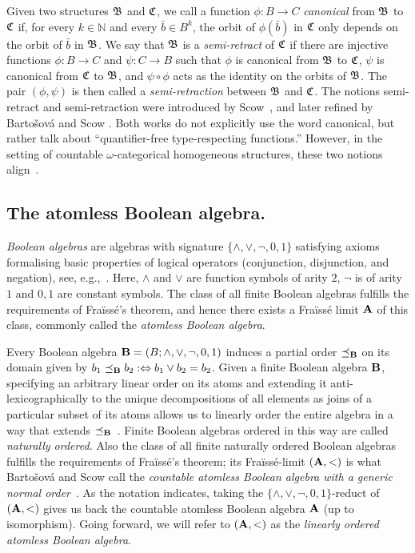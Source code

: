 Given two structures $\mathfrak{B}$ and $\mathfrak{C}$, we call a function $\phi\colon B\rightarrow C$ \emph{canonical} from $\mathfrak{B}$ to $\mathfrak{C}$ if, for every $k\in \mathbb{N}$ and every $\bar{b}\in B^k$, the orbit of $\phi(\bar{b})$ in $\mathfrak{C}$ only depends on the orbit of $\bar{b}$ in $\mathfrak{B}$.
%
We say that $\mathfrak{B}$ is a \emph{semi-retract} of $\mathfrak{C}$ if there are injective functions $\phi\colon B\rightarrow C$ and $\psi\colon C\rightarrow B$ such that $\phi$ is canonical from $\mathfrak{B}$ to $\mathfrak{C}$, $\psi$ is canonical from $\mathfrak{C}$ to $\mathfrak{B}$, and  $\psi\circ\phi$ acts as the identity on the orbits of $\mathfrak{B}$.
%
The pair $(\phi,\psi)$ is then called a \emph{semi-retraction} between $\mathfrak{B}$ and $\mathfrak{C}$.
%
The notions semi-retract and semi-retraction were introduced by Scow~\cite{scow2021ramsey}, and later refined by Barto\v{s}ov\'a and Scow \cite{BARTOŠOVÁ_SCOW_2024}.  
%
Both works do not explicitly use the word canonical, but rather talk about ``quantifier-free type-respecting functions.''
%
However, in the setting of countable $\omega$-categorical homogeneous structures, these two notions align~\cite[Statement~2.22]{Cameron_1990}.  


\subsection*{The atomless Boolean algebra.}
%
\emph{Boolean algebras} are algebras with signature $\{\wedge,\vee,\neg,0,1\}$ satisfying axioms formalising basic properties of logical operators (conjunction, disjunction, and negation), see, e.g.,~\cite[Section~2.1.4]{bodirsky2021complexity}. 
%
Here, $\wedge$ and $\vee$ are function symbols of arity $2$, $\neg$ is of arity $1$ and $0,1$ are constant symbols. 
%
The class of all finite Boolean algebras fulfills the requirements of Fra\"iss\'e's theorem, and hence there exists a Fra\"iss\'e limit $\mathbf{A}$ of this class, commonly called the \emph{atomless Boolean algebra}.

Every Boolean algebra $\mathbf{B}=(B;\wedge,\vee,\neg,0,1)$ induces a partial order $\preceq_{\mathbf{B}}$ on its domain given by $b_1 \preceq_{\mathbf{B}} b_2:\Leftrightarrow b_1\vee b_2=b_2$. 
%  
Given a finite Boolean algebra $\mathbf{B}$, specifying an arbitrary linear order on its atoms and extending it anti-lexicographically to the unique decompositions of all elements as joins of a particular subset of its atoms allows us to linearly order the entire algebra in a way that extends $\preceq_{\mathbf{B}}$~\cite{kechris2005fraisse}.
%  
Finite Boolean algebras ordered in this way are called \emph{naturally ordered.}
%
Also the class of all finite naturally ordered Boolean algebras fulfills the requirements of Fra\"iss\'e's theorem;
% 
its Fra\"iss\'e-limit $(\mathbf{A},<)$ is what Barto\v{s}ov\'a and Scow call the \emph{countable atomless Boolean algebra with a generic normal order}~\cite{BARTOŠOVÁ_SCOW_2024}.
%
As the notation indicates, taking the $\{\wedge,\vee,\neg,0,1\}$-reduct of $(\mathbf{A},<)$ gives us back the countable atomless Boolean algebra $\mathbf{A}$ (up to isomorphism).
%
Going forward, we will refer to $(\mathbf{A},<)$ as the \emph{linearly ordered atomless Boolean algebra}. 


